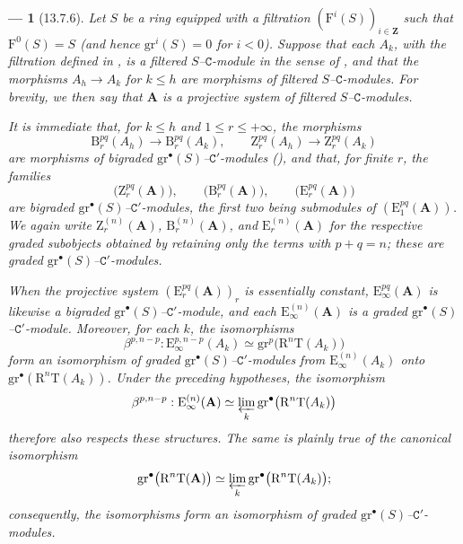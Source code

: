 \documentclass[oneside]{amsart}
\theoremstyle{ega-env-style}
\newtheorem*{env}{---}
\theoremstyle{ega-thm-env-style}
\theoremstyle{ega-defn-env-style}
\def\bb{\mathbf}                    %
\def\cat{\mathtt}                   %
\def\leq{\leqslant}                 %
\def\RR{\mathrm{R}}                 %
\def\isoto{\simeq} %
\let\EGAOriginalLabel\label
\renewcommand{\label}[1]{\phantomsection\EGAOriginalLabel{#1}}
\begin{document}
\begin{env}[13.7.6]
\label{0.13.7.6}
Let $S$ be a ring equipped with a filtration
$(\mathrm{F}^i(S))_{i\in\bb{Z}}$ such that
$\mathrm{F}^0(S)=S$ (and hence
$\mathrm{gr}^i(S)=0$ for $i<0$).
Suppose that each $A_k$, with the filtration defined in
, is a filtered
$S$--$\cat{C}$-module in the sense of , and that the
morphisms $A_h\longrightarrow A_k$ for $k\leq h$ are morphisms of
filtered $S$--$\cat{C}$-modules.
For brevity, we then say that $\bb{A}$ is a
\emph{projective system of filtered $S$--$\cat{C}$-modules}.

It is immediate that, for $k\leq h$ and
$1\leq r\leq+\infty$, the morphisms
\[
  \mathrm{B}_r^{pq}(A_h)\longrightarrow\mathrm{B}_r^{pq}(A_k),
  \qquad
  \mathrm{Z}_r^{pq}(A_h)\longrightarrow\mathrm{Z}_r^{pq}(A_k)
\]
are morphisms of bigraded
$\mathrm{gr}^\bullet(S)$--$\cat{C}'$-modules
(), and that, for finite $r$, the families
\[
  \bigl(\mathrm{Z}_r^{pq}(\bb{A})\bigr),\qquad
  \bigl(\mathrm{B}_r^{pq}(\bb{A})\bigr),\qquad
  \bigl(\mathrm{E}_r^{pq}(\bb{A})\bigr)
\]
are bigraded
$\mathrm{gr}^\bullet(S)$--$\cat{C}'$-modules, the first two being
submodules of $(\mathrm{E}_1^{pq}(\bb{A}))$.
We again write
$\mathrm{Z}_r^{(n)}(\bb{A})$,
$\mathrm{B}_r^{(n)}(\bb{A})$, and
$\mathrm{E}_r^{(n)}(\bb{A})$ for the respective graded subobjects
obtained by retaining only the terms with $p+q=n$; these are graded
$\mathrm{gr}^\bullet(S)$--$\cat{C}'$-modules.

When the projective system
$(\mathrm{E}_r^{pq}(\bb{A}))_r$ is essentially constant,
$\mathrm{E}_\infty^{pq}(\bb{A})$ is likewise a bigraded
$\mathrm{gr}^\bullet(S)$--$\cat{C}'$-module, and each
$\mathrm{E}_\infty^{(n)}(\bb{A})$ is a graded
$\mathrm{gr}^\bullet(S)$--$\cat{C}'$-module.
Moreover, for each $k$, the isomorphisms
\[
  \beta^{p,n-p}:
  \mathrm{E}_\infty^{p,n-p}(A_k)
  \isoto
  \mathrm{gr}^p\bigl(\RR^n\mathrm{T}(A_k)\bigr)
\]
form an isomorphism of graded
$\mathrm{gr}^\bullet(S)$--$\cat{C}'$-modules from
$\mathrm{E}_\infty^{(n)}(A_k)$ onto
$\mathrm{gr}^\bullet(\RR^n\mathrm{T}(A_k))$.
Under the preceding hypotheses, the isomorphism
\[
  \beta^{p,n-p}:
  \mathrm{E}_\infty^{(n)}(\bb{A})
  \isoto
  \varprojlim_k
  \mathrm{gr}^\bullet\bigl(\RR^n\mathrm{T}(A_k)\bigr)
\]
therefore also respects these structures.
The same is plainly true of the canonical isomorphism
\[
  \mathrm{gr}^\bullet\bigl(\RR^n\mathrm{T}(\bb{A})\bigr)
  \isoto
  \varprojlim_k
  \mathrm{gr}^\bullet\bigl(\RR^n\mathrm{T}(A_k)\bigr);
\]
consequently, the isomorphisms  form an
isomorphism of graded
$\mathrm{gr}^\bullet(S)$--$\cat{C}'$-modules.
\end{env}
\end{document}
